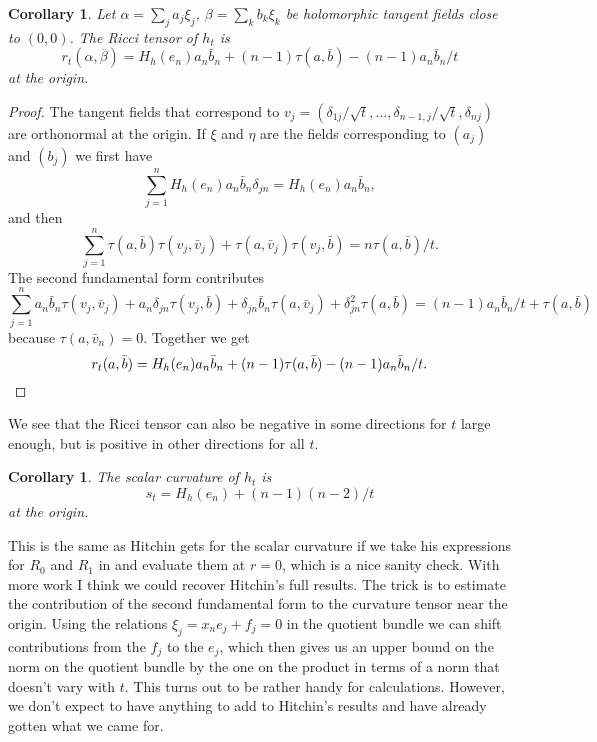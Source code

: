 \documentclass[10pt,a4paper]{amsart}
\newtheorem{coro}[theo]{Corollary}
\def\ov#1{\overline{#1}}
\begin{document}
\begin{coro}
Let
$\alpha = \sum_j a_j \xi_j$,
$\beta = \sum_k b_k \xi_k$
be holomorphic tangent fields close to $(0,0)$.
The Ricci tensor of $h_t$ is
$$
r_t(\alpha, \ov\beta)
= H_h(e_n) a_n \bar b_n
+ (n-1) \tau(a, \bar b)
- (n-1) a_n \bar b_n / t
$$
at the origin.
\end{coro}

\begin{proof}
The tangent fields that correspond to
$v_j = (\delta_{1j}/\sqrt t, \ldots, \delta_{n-1,j}/\sqrt t, \delta_{nj})$ are
orthonormal at the origin.
If $\xi$ and $\eta$ are the fields corresponding to $(a_j)$ and $(b_j)$ we
first have
$$
\sum_{j=1}^n H_h(e_n) a_n \bar b_n \delta_{jn} = H_h(e_n) a_n \bar b_n,
$$
and then
$$
\sum_{j=1}^n
\tau(a, \bar b) \tau(v_j, \bar v_j) + \tau(a, \bar v_j) \tau(v_j, \bar b)
= n \tau(a, \bar b) / t.
$$
The second fundamental form contributes
$$
\sum_{j=1}^n
a_n \bar b_n \tau(v_j, \bar v_j)
+ a_n \delta_{jn} \tau(v_j, \bar b)
+ \delta_{jn} \bar b_n \tau(a, \bar v_j)
+ \delta_{jn}^2 \tau(a, \bar b)
= (n-1) a_n \bar b_n / t + \tau(a, \bar b)
$$
because $\tau(a, \bar v_n) = 0$.
Together we get
\[
r_t(a, \bar b)
= H_h(e_n) a_n \bar b_n
+ (n-1) \tau(a, \bar b)
- (n-1) a_n \bar b_n / t.
\qedhere
\]
\end{proof}

We see that the Ricci tensor can also be negative in some directions for $t$
large enough, but is positive in other directions for all $t$.


\begin{coro}
The scalar curvature of $h_t$ is
$$
s_t
= H_h(e_n)
+ (n-1)(n-2) / t
$$
at the origin.
\end{coro}

This is the same as Hitchin gets for the scalar curvature if we take his
expressions for $R_0$ and $R_1$ in \cite[Lemmas~5.15 and
5.16]{hitchin1975curvature} and evaluate them at $r = 0$, which is
a nice sanity check.
With more work I think we could recover Hitchin's full results.
The trick is to estimate the contribution of the second fundamental form
to the curvature tensor near the origin.
Using the relations $\xi_j = x_n e_j + f_j = 0$ in the quotient bundle we can
shift contributions from the $f_j$ to the $e_j$, which then gives us an upper
bound on the norm on the quotient bundle by the one on the product in terms
of a norm that doesn't vary with $t$.
This turns out to be rather handy for calculations.
However, we don't expect to have anything to add to Hitchin's results and
have already gotten what we came for.






\end{document}
